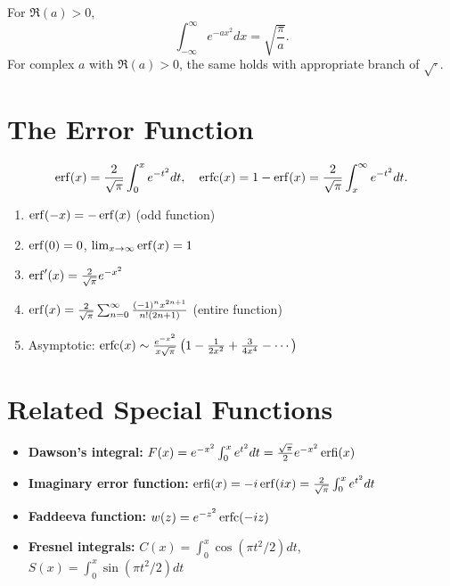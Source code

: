 \begin{theorem}
For $\Re(a) > 0$,
\[
\int_{-\infty}^{\infty} e^{-a x^2} dx = \sqrt{\frac{\pi}{a}}.
\]
For complex $a$ with $\Re(a) > 0$, the same holds with appropriate branch of $\sqrt{\cdot}$.
\end{theorem}

\section{The Error Function}

\begin{definition}
\[
\operatorname{erf}(x) = \frac{2}{\sqrt{\pi}} \int_0^x e^{-t^2} dt, \quad
\operatorname{erfc}(x) = 1 - \operatorname{erf}(x) = \frac{2}{\sqrt{\pi}} \int_x^{\infty} e^{-t^2} dt.
\]
\end{definition}

\begin{theorem}
\begin{enumerate}
    \item $\operatorname{erf}(-x) = -\operatorname{erf}(x)$ (odd function)
    \item $\operatorname{erf}(0) = 0$, $\lim_{x\to\infty} \operatorname{erf}(x) = 1$
    \item $\operatorname{erf}'(x) = \frac{2}{\sqrt{\pi}} e^{-x^2}$
    \item $\operatorname{erf}(x) = \frac{2}{\sqrt{\pi}} \sum_{n=0}^{\infty} \frac{(-1)^n x^{2n+1}}{n!(2n+1)}$ (entire function)
    \item Asymptotic: $\operatorname{erfc}(x) \sim \frac{e^{-x^2}}{x\sqrt{\pi}} \left(1 - \frac{1}{2x^2} + \frac{3}{4x^4} - \cdots \right)$
\end{enumerate}
\end{theorem}

\section{Related Special Functions}

\begin{itemize}
    \item \textbf{Dawson's integral:} $F(x) = e^{-x^2} \int_0^x e^{t^2} dt = \frac{\sqrt{\pi}}{2} e^{-x^2} \operatorname{erfi}(x)$
    \item \textbf{Imaginary error function:} $\operatorname{erfi}(x) = -i \operatorname{erf}(ix) = \frac{2}{\sqrt{\pi}} \int_0^x e^{t^2} dt$
    \item \textbf{Faddeeva function:} $w(z) = e^{-z^2} \operatorname{erfc}(-iz)$
    \item \textbf{Fresnel integrals:} $C(x) = \int_0^x \cos(\pi t^2/2) dt$, $S(x) = \int_0^x \sin(\pi t^2/2) dt$
\end{itemize}

